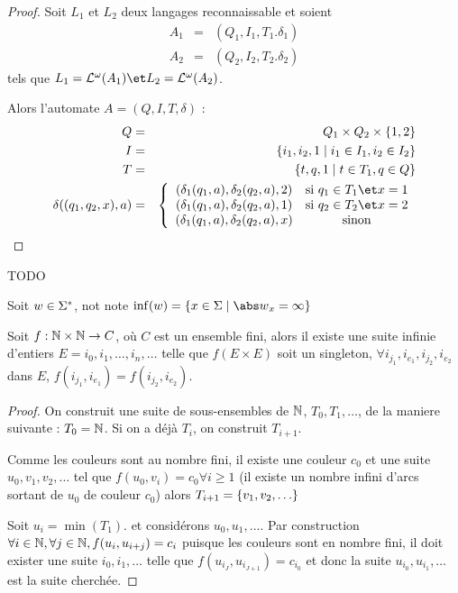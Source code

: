 \begin{proof}
	Soit $L_1$ et $L_2$ deux langages reconnaissable et soient
	\begin{eqnarray*}
		A_1 &=& (Q_1,I_1,T_1.\delta_1) \\
		A_2 &=& (Q_2,I_2,T_2.\delta_2)
	\end{eqnarray*}
	tels que $L_1 = \La ^ {\omega} (A_1) \et  L_2 = \La ^ {\omega} (A_2)$.

	Alors l'automate $A = (Q,I,T,\delta)$ :
	\begin{eqnarray*}
		Q &=& Q_1 \times Q_2 \times \set{1,2}  \\
		I &=& \setdef {i_1,i_2,1} {i_1 \in I_1,i_2 \in I_2 } \\
		T &=&  \setdef {t,q,1} {t \in T_1, q \in Q} \\
		\delta ((q_1,q_2,x), a) &=&
		\left\{
		\begin{array}{cc}
			(\delta_1(q_1,a), \delta_2 (q_2,a), 2) & \text {si } q_1 \in T_1 \et x = 1 \\
			(\delta_1(q_1,a), \delta_2 (q_2,a), 1) & \text {si } q_2 \in T_2 \et x = 2 \\
			(\delta_1(q_1,a), \delta_2 (q_2,a), x) & \text {sinon}
		\end{array}
		\right.
	\end{eqnarray*}
\end{proof}

\begin{exemple}
	TODO
\end{exemple}

\begin{notation}
	Soit $w \in \Sigma^{*}$, not note $\inf (w) = \setdef {x \in \alphabet} {{\abs w}_x = \infty}$
\end{notation}



\begin{theorem}
	Soit $f : \mathbb{N} \times \mathbb{N} \to C $, où $C$ est un ensemble fini, alors il existe une suite infinie d'entiers $E = i_0, i_1, \ldots, i_n, \ldots$
	telle que $f(E \times E)$ soit un singleton, \ie $\forall i_{j_1},i_{e_1},i_{j_2},i_{e_2}$ dans $E$, $f(i_{j_1},i_{e_1})=f(i_{j_2},i_{e_2})$.
\end{theorem}

\begin{proof}
	On construit une suite de sous-ensembles de $\mathbb{N}$, $T_0, T_1, \ldots$, de la maniere suivante :
	$T_0 = \mathbb{N}$. Si on a déjà $T_i$, on construit $T_{i+1}$.

	Comme les couleurs sont au nombre fini, il existe une couleur $c_0$ et une suite
	$u_0, v_1, v_2, \ldots$ tel que $f(u_0, v_i) = c_0 \forall i \geq 1$ (il existe un nombre infini d'arcs sortant de $u_0$ de couleur $c_0$)
	alors $T_{i+1} = \left\{v_1, v_2, \ldots\right\}$


	Soit $u_i = \min (T_1)$. et considérons $u_0, u_1, \ldots$. Par construction $\forall i \in \mathbb{N}, \forall j \in \mathbb{N}, f(u_i, u_{i + j}) = c_i$
	puisque les couleurs sont en nombre fini, il doit exister une suite $i_0, i_1, \ldots$ telle que $f(u_{i_J}, u_{i_{J+1}}) = c_{i_0}$
	et donc la suite $u_{i_0},u_{i_1}, \ldots$ est la suite cherchée.
\end{proof}



